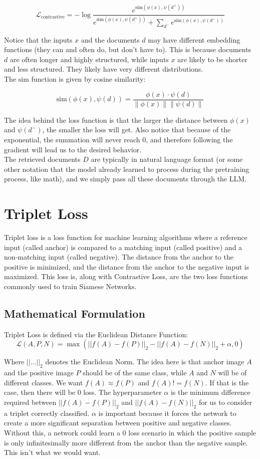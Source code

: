 \documentclass[12pt]{article}
\begin{document}
\[
\mathcal{L}_{\text{contrastive}} = -\log \frac{e^{\text{sim}(\phi(x), \psi(d^+))}}{e^{\text{sim}(\phi(x), \psi(d^+))} + \sum_{d^-} e^{\text{sim}(\phi(x), \psi(d^-))}}
\]

Notice that the inputs \(x\) and the documents \(d\) may have different embedding functions (they can and often do, but don't have to). This is because documents \(d\) are often longer and highly structured, while inputs \(x\) are likely to be shorter and less structured. They likely have very different distributions. \\

The \(\text{sim}\) function is given by cosine similarity:

\[
\text{sim}(\phi(x), \psi(d)) = \frac{\phi(x) \cdot \psi(d)}{\|\phi(x)\| \|\psi(d)\|}
\]

The idea behind the loss function is that the larger the distance between \(\phi(x)\) and \(\psi(d^-)\), the smaller the loss will get. Also notice that because of the exponential, the summation will never reach 0, and therefore following the gradient will lead us to the desired behavior. \\

The retrieved documents \(D\) are typically in natural language format (or some other notation that the model already learned to process during the pretraining process, like math), and we simply pass all these documents through the LLM.

\section{Triplet Loss}
Triplet loss is a loss function for machine learning algorithms where a reference input (called anchor) is compared to a matching input (called positive) and a non-matching input (called negative). The distance from the anchor to the positive is minimized, and the distance from the anchor to the negative input is maximized. This loss is, along with Contrastive Loss, are the two loss functions commonly used to train Siamese Networks.

\subsection{Mathematical Formulation}
Triplet Loss is defined via the Euclidean Distance Function:
\[\mathcal{L}(A, P, N) = \max (|| f(A) - f(P)||_2 - || f(A) - f(N) ||_2 + \alpha, 0)\]

Where \(|| ... ||_2\) denotes the Euclidean Norm. The idea here is that anchor image \(A\) and the positive image \(P\) should be of the same class, while \(A\) and \(N\) will be of different classes. We want  \(f(A) \approx f(P)\) and \(f(A) != f(N)\). If that is the case, then there will be 0 loss. The hyperparameter \(\alpha\) is the minimum difference required between \(|| f(A) - f(P)||_2\) and \( || f(A) - f(N) ||_2\) for us to consider a triplet correctly classified. \(\alpha\) is important because it forces the network to create a more significant separation between positive and negative classes. Without this, a network could learn a 0 loss scenario in which the positive sample is only infinitesimally more different from the anchor than the negative sample. This isn't what we would want. 
\end{document}
